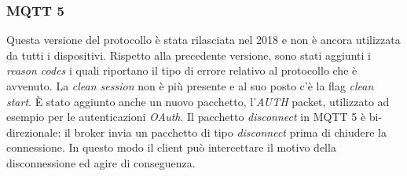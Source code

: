 \documentclass[binding=0.6cm,TFA]{sapthesis}
\begin{document}
\begin{large}
\subsubsection{MQTT 5}
Questa versione del protocollo è stata rilasciata nel 2018 e non è ancora utilizzata da tutti i dispositivi. Rispetto alla precedente versione, sono stati aggiunti i \textit{reason codes} i quali riportano il tipo di errore relativo al protocollo che è avvenuto. La \textit{clean session} non è più presente e al suo posto c'è la flag \textit{clean start}. È stato aggiunto anche un nuovo pacchetto, l'\textit{AUTH} packet, utilizzato ad esempio per le autenticazioni \textit{OAuth}. Il pacchetto \textit{disconnect} in MQTT 5 è bi-direzionale: il broker invia un pacchetto di tipo \textit{disconnect} prima di chiudere la connessione. In questo modo il client può intercettare il motivo della disconnessione ed agire di conseguenza.

\end{large}
\end{document}
